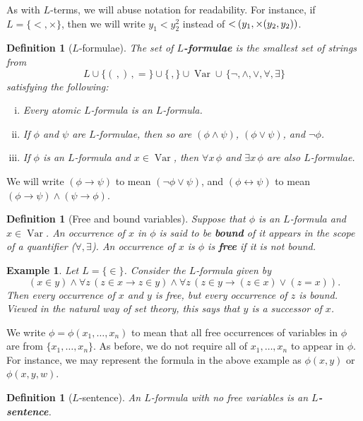 \documentclass[10pt]{article}
\DeclareMathOperator{\Var}{Var}
\theoremstyle{newstyle}
\newtheorem{defn}[thm]{Definition}
\newtheorem{exmp}[thm]{Example}
\begin{document}
As with $L$-terms, we will abuse notation for readability. For instance, if $L = \{<, \times\}$, 
then we will write $y_1 < y_2^2$ instead of $<\hspace{-0.2ex}(y_1, \times(y_2, y_2))$.

\begin{defn}[$L$-formulae]
The set of {\bf $L$-formulae} is the smallest set of strings from 
\[ L \cup \{(\,, )\,, =\} \cup \{\,,\} \cup \Var \cup \,\{\neg, \wedge, \vee, \forall, \exists\} \] 
satisfying the following:
\begin{enumerate}[(i)]
    \item Every atomic $L$-formula is an $L$-formula.
    \item If $\phi$ and $\psi$ are $L$-formulae, then so are $(\phi \wedge \psi)$, 
    $(\phi \vee \psi)$, and $\neg \phi$.
    \item If $\phi$ is an $L$-formula and $x \in \Var$, then 
    $\forall x \, \phi$ and $\exists x \, \phi$ are also $L$-formulae.
\end{enumerate}
\end{defn}
We will write $(\phi \to \psi)$ to mean 
$(\neg \phi \vee \psi)$, and $(\phi \leftrightarrow \psi)$ to mean 
$(\phi \to \psi) \wedge (\psi \to \phi)$.

\begin{defn}[Free and bound variables] 
Suppose that $\phi$ is an $L$-formula and $x \in \Var$. An occurrence of $x$ in $\phi$ is 
said to be {\bf bound} of it appears in the scope of a quantifier ($\forall, \exists$). 
An occurrence of $x$ is $\phi$ is {\bf free} if it is not bound.
\end{defn}

\begin{exmp}
Let $L = \{\in\}$. Consider the $L$-formula given by 
\[ (x \in y) \wedge \forall z \, (z \in x \to z \in y) \wedge \forall z \, (z \in y 
\to (z \in x) \vee (z = x)). \] 
Then every occurrence of $x$ and $y$ is free, but every occurrence of $z$ is bound. 
Viewed in the natural way of set theory, this says that $y$ is a successor of $x$.
\end{exmp}

We write $\phi = \phi(x_1, \dots, x_n)$ to mean that all free occurrences of variables 
in $\phi$ are from $\{x_1, \dots, x_n\}$. As before, we do not require all of 
$x_1, \dots, x_n$ to appear in $\phi$. For instance, we may represent the formula in the 
above example as $\phi(x, y)$ or $\phi(x, y, w)$.

\begin{defn}[$L$-sentence]
An $L$-formula with no free variables is an {\bf $L$-sentence}.
\end{defn}
\end{document}
